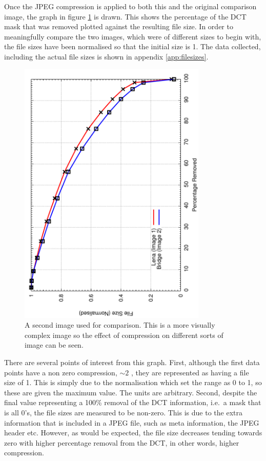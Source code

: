 Once the JPEG compression is applied to both this and the original comparison image, the graph in figure \ref{fig:comparason_graph} is drawn. This shows the percentage of the DCT mask that was removed plotted against the resulting file size. In order to meaningfully compare the two images, which were of different sizes to begin with, the file sizes have been normalised so that the initial size is 1. The data collected, including the actual file sizes is shown in appendix \ref{app:filesizes}.
\begin{figure}[ht]
	\centering
	\includegraphics[angle=270,width=0.8\textwidth]{comparason_graph2.pdf}
	\caption{A second image used for comparison. This is a more visually complex image so the effect of compression on different sorts of image can be seen.\label{fig:comparason_graph}}
\end{figure}

There are several points of interest from this graph. First, although the first data points have a non zero compression, $\sim2$ , they are represented as having a file size of 1. This is simply due to the normalisation which set the range as 0 to 1, so these are given the maximum value. The units are arbitrary. Second, despite the final value representing a 100\% removal of the DCT information, i.e.\ a mask that is all 0's, the file sizes are measured to be non-zero. This is due to the extra information that is included in a JPEG file, such as meta information, the JPEG header etc. However, as would be expected, the file size decreases tending towards zero with higher percentage removal from the DCT, in other words, higher compression.

